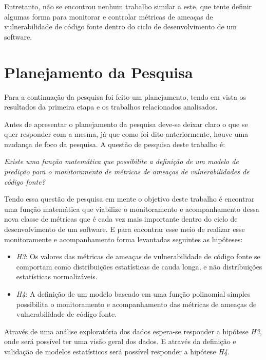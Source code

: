 Entretanto, não se encontrou nenhum trabalho similar a este, que tente definir
algumas forma para monitorar e controlar métricas de ameaças de vulnerabilidade
de código fonte dentro do ciclo de desenvolvimento de um software.




\section{Planejamento da Pesquisa}\label{metodologia:planejamentopesquisa}

Para a continuação da pesquisa foi feito um planejamento, tendo em vista os
resultados da primeira etapa e os trabalhos relacionados analisados.

Antes de apresentar o planejamento da pesquisa deve-se deixar claro o que se quer
responder com a mesma, já que como foi dito anteriormente, houve uma mudança de
foco da pesquisa. A questão de pesquisa deste trabalho é:

\begin{center}
  \textit{Existe uma função matemática que possibilite a definição de um modelo de
  predição para o monitoramento de métricas de ameaças de vulnerabilidades de
  código fonte?}
\end{center}

Tendo essa questão de pesquisa em mente o objetivo deste trabalho é encontrar
uma função matemática que viabilize o monitoramento e acompanhamento dessa nova classe de
métricas que é cada vez mais importante dentro do ciclo de desenvolvimento de um
software. E para encontrar esse meio de realizar esse monitoramente e
acompanhamento forma levantadas seguintes as hipóteses:

\begin{itemize}\label{hipoteses2}
  \item \textit{H3}: Os valores das métricas de ameaças de vulnerabilidade de
    código fonte se comportam como distribuições estatísticas de cauda longa, e
    não distribuições estatísticas normalizáveis.

  \item \textit{H4}: A definição de um modelo baseado em uma função polinomial
   simples possibilita o monitoramento e acompanhamento das métricas de ameaças
   de vulnerabilidade de código fonte.
\end{itemize}

Através de uma análise exploratória dos dados espera-se responder a hipótese
\textit{H3}, onde será possível ter uma visão geral dos dados. E através da
definição e validação de modelos estatísticos será possível responder a hipótese
\textit{H4}.

